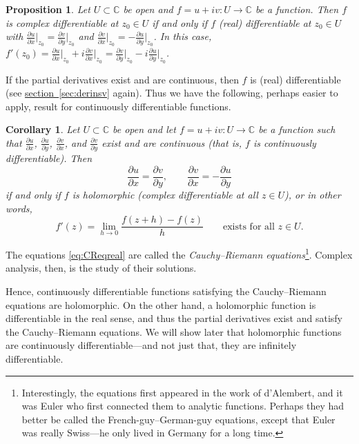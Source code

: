\documentclass[12pt,openany]{book}
\newcommand{\C}{{\mathbb{C}}}
\newcommand{\myindex}[1]{#1\index{#1}}
\theoremstyle{plain}
\newtheorem{prop}[thm]{Proposition}
\newtheorem{cor}[thm]{Corollary}
\theoremstyle{remark}
\theoremstyle{definition}
\theoremstyle{exercise}
\theoremstyle{example}
\newcommand{\sectionref}[1]{\hyperref[#1]{section~\ref*{#1}}}
\begin{document}
\begin{prop}
Let $U \subset \C$ be open and $f = u+iv \colon U \to \C$ be a function.
Then
$f$ is complex differentiable at $z_0 \in U$
if and only if
$f$ (real) differentiable at $z_0 \in U$
with
$\frac{\partial u}{\partial x}\big|_{z_0} =
\frac{\partial v}{\partial y}\big|_{z_0}$
and
$\frac{\partial v}{\partial x}\big|_{z_0} =
-\frac{\partial u}{\partial y}\big|_{z_0}$.
In this case,
$f'(z_0) = 
\frac{\partial u}{\partial x}\big|_{z_0} + i \frac{\partial v}{\partial
x}\big|_{z_0} = \frac{\partial v}{\partial y}\big|_{z_0} - i \frac{\partial
u}{\partial y}\big|_{z_0}$.
\end{prop}

If the partial derivatives exist and are continuous, then $f$ is
(real) differentiable (see \sectionref{sec:derinsv} again).
Thus we have the following, perhaps easier to apply, result
for continuously differentiable functions.

\begin{cor}
Let $U \subset \C$ be open and let $f = u+iv \colon U \to \C$ be a function
such that $\frac{\partial u}{\partial x}$, $\frac{\partial u}{\partial y}$, $\frac{\partial
v}{\partial x}$, and $\frac{\partial v}{\partial y}$ exist and are continuous (that is,
$f$ is continuously differentiable).
Then
\begin{equation} \label{eq:CReqreal}
\frac{\partial u}{\partial x} = \frac{\partial v}{\partial y} , \qquad
\frac{\partial v}{\partial x} = -\frac{\partial u}{\partial y}
\end{equation}
if and only if $f$ is holomorphic (complex differentiable at all $z \in U$),
or in other words,
\begin{equation*}
f'(z) =
\lim_{h \to 0} \frac{f(z+h) - f(z)}{h}
\qquad
\text{exists for all $z \in U$.}
\end{equation*}
\end{cor}

The equations \eqref{eq:CReqreal} are called the
\emph{\myindex{Cauchy--Riemann equations}}\footnote{Interestingly,
the equations first appeared in the work of d'Alembert, and
it was Euler who first connected them to analytic functions.
Perhaps they had better be called the French-guy--German-guy equations,
except that Euler was really Swiss---he only lived in Germany for a long time.}.
Complex analysis, then, is the study of their solutions.

Hence, continuously differentiable functions satisfying
the Cauchy--Riemann equations are holomorphic.
On the other hand,
a holomorphic function is differentiable in the real sense,
and thus the partial derivatives exist and satisfy the Cauchy--Riemann
equations.  We will show later that holomorphic functions are
continuously differentiable---and not just that, they are
infinitely differentiable.
\end{document}
